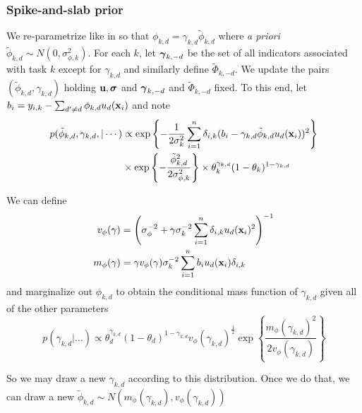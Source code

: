 \documentclass[12pt]{article}
\begin{document}
\subsubsection{Spike-and-slab prior}

We re-parametrize like in \citet{Titsias2011} so that $\phi_{k,d} = \gamma_{k,d}\tilde{\phi}_{k,d}$ where \textit{a priori} $\tilde{\phi}_{k,d} \sim N(0,\sigma^{2}_{\phi,k}).$
For each $k$, let $\boldsymbol{\gamma}_{k,-d}$ be the set of all indicators associated with task $k$ except for $\gamma_{k,d}$ and similarly define $\tilde{\Phi}_{k,-d}.$
We update the pairs $(\tilde{\phi}_{k,d}, \gamma_{k,d})$ holding $\mathbf{u}, \boldsymbol{\sigma}$ and $\boldsymbol{\gamma}_{k,-d}$ and $\tilde{\Phi}_{k,-d}$ fixed.
To this end, let $b_{i} = y_{i,k} - \sum_{d' \neq d}{\phi_{k,d}u_{d}(\mathbf{x}_{i})}$ and note
\begin{align*}
p(\tilde{\phi}_{k,d}, \gamma_{k,d},| \cdots) &\propto \exp\left\{-\frac{1}{2\sigma^{2}_{k}}\sum_{i = 1}^{n}{\delta_{i,k}(b_{i} - \gamma_{k,d}\tilde{\phi}_{k,d}u_{d}(\mathbf{x}_{i}))^{2}} \right\} \\
&\times \exp\left\{-\frac{\tilde{\phi}^{2}_{k,d}}{2\sigma^{2}_{\phi,k}} \right\} \times \theta_{k}^{\gamma_{k,d}}(1 - \theta_{k})^{1 - \gamma_{k,d}}
\end{align*}

We can define
\begin{align*}
v_{\phi}(\gamma) &= \left(\sigma_{\phi}^{-2} + \gamma\sigma^{-2}_{k}\sum_{i = 1}^{n}{\delta_{i,k}u_{d}(\mathbf{x}_{i})^{2}}\right)^{-1} \\
m_{\phi}(\gamma) &= \gamma v_{\phi}(\gamma)\sigma^{-2}_{k}\sum_{i = 1}^{n}{b_{i}u_{d}(\mathbf{x}_{i})\delta_{i,k}}
\end{align*}
and marginalize out $\phi_{k,d}$ to obtain the conditional mass function of $\gamma_{k,d}$ given all of the other parameters
$$
p(\gamma_{k,d} | \ldots) \propto \theta_{d}^{\gamma_{k,d}}(1 - \theta_{d})^{1 - \gamma_{k,d}}v_{\phi}(\gamma_{k,d})^{\frac{1}{2}}\exp\left\{\frac{m_{\phi}(\gamma_{k,d})^{2}}{2v_{\phi}(\gamma_{k,d})}\right\}
$$

So we may draw a new $\gamma_{k,d}$ according to this distribution.
Once we do that, we can draw a new $\tilde{\phi}_{k,d} \sim N(m_{\phi}(\gamma_{k,d}), v_{\phi}(\gamma_{k,d}))$
\end{document}
